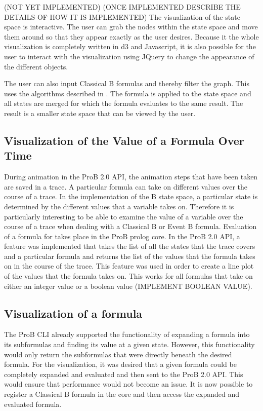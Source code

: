(NOT YET IMPLEMENTED)
(ONCE IMPLEMENTED DESCRIBE THE DETAILS OF HOW IT IS IMPLEMENTED)
The visualization of the state space is interactive. The user can grab the nodes within the state space and move them around so that they appear exactly as the user desires. Because it the whole visualization is completely written in d3 and Javascript, it is also possible for the user to interact with the visualization using JQuery to change the appearance of the different objects. 

The user can also input Classical B formulas and thereby filter the graph. This uses the algorithms described in \cite{LeTu05_8}. The formula is applied to the state space and all states are merged for which the formula evaluates to the same result. The result is a smaller state space that can be viewed by the user.

\subsection{Visualization of the Value of a Formula Over Time}

During animation in the ProB 2.0 API, the animation steps that have been taken are saved in a trace. A particular formula can take on different values over the course of a trace. In the implementation of the B state space, a particular state is determined by the different values that a variable takes on. Therefore it is particularly interesting to be able to examine the value of a variable over the course of a trace when dealing with a Classical B or Event B formula. 
Evaluation of a formula for takes place in the ProB prolog core. In the ProB 2.0 API, a feature was implemented that takes the list of all the states that the trace covers and a particular formula and returns the list of the values that the formula takes on in the course of the trace. This feature was used in order to create a line plot of the values that the formula takes on. This works for all formulas that take on either an integer value or a boolean value (IMPLEMENT BOOLEAN VALUE).

\subsection{Visualization of a formula}

The ProB CLI already supported the functionality of expanding a formula into its subformulas and finding its value at a given state. However, this functionality would only return the subformulas that were directly beneath the desired formula. For the visualization, it was desired that a given formula could be completely expanded and evaluated and then sent to the ProB 2.0 API. This would ensure that performance would not become an issue. It is now possible to register a Classical B formula in the core and then access the expanded and evaluated formula.

